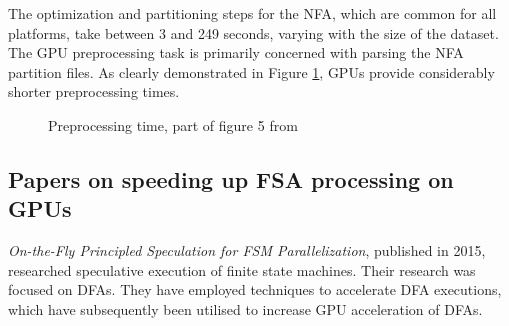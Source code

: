 \documentclass[10pt,onecolumn,twoside,english,a4paper]{article}
\begin{document}
The optimization and partitioning steps for the NFA, which are common for all platforms, take between 3 and 249 seconds, varying with the size of the dataset. The GPU preprocessing task is primarily concerned with parsing the NFA partition files. As clearly demonstrated in Figure \ref{preprocessing:DemystifyingFSA}, GPUs provide considerably shorter preprocessing times.
\begin{figure}[h!]
  \centering
  \caption{Preprocessing time, part of figure 5 from \cite{Nourian:DemystifyingFSA}}
  \label{preprocessing:DemystifyingFSA}
\end{figure}
\subsection{Papers on speeding up FSA processing on GPUs} \label{speeding up FSA processing on GPUs}
\textit{On-the-Fly Principled Speculation for FSM Parallelization}\cite{zhao2015fly}, published in 2015, researched speculative execution of finite state machines. Their research was focused on DFAs. They have employed techniques to accelerate DFA executions, which have subsequently been utilised to increase GPU acceleration of DFAs.
\end{document}
